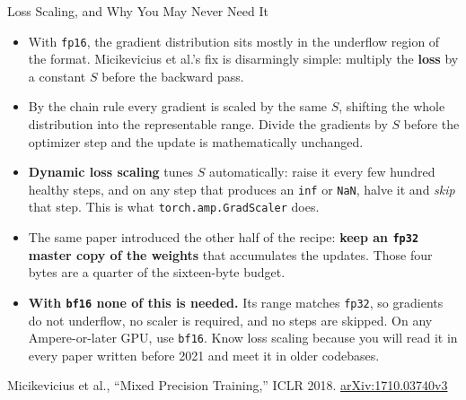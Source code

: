 \begin{frame}[allowframebreaks]{Loss Scaling, and Why You May Never Need It}
  \begin{itemize}\itemsep0.4em
    \item[\textcolor{red}{$\blacktriangleright$}] With \texttt{fp16}, the gradient distribution sits mostly in the underflow region of the format. Micikevicius et al.'s fix is disarmingly simple: multiply the \textbf{loss} by a constant $S$ before the backward pass.
    \item[\textcolor{red}{$\blacktriangleright$}] By the chain rule every gradient is scaled by the same $S$, shifting the whole distribution into the representable range. Divide the gradients by $S$ before the optimizer step and the update is mathematically unchanged.
    \item[\textcolor{red}{$\blacktriangleright$}] \textbf{Dynamic loss scaling} tunes $S$ automatically: raise it every few hundred healthy steps, and on any step that produces an \texttt{inf} or \texttt{NaN}, halve it and \emph{skip} that step. This is what \texttt{torch.amp.GradScaler} does.
    \item[\textcolor{red}{$\blacktriangleright$}] The same paper introduced the other half of the recipe: \textbf{keep an \texttt{fp32} master copy of the weights} that accumulates the updates. Those four bytes are a quarter of the sixteen-byte budget.
    \item[\textcolor{red}{$\blacktriangleright$}] \textbf{With \texttt{bf16} none of this is needed.} Its range matches \texttt{fp32}, so gradients do not underflow, no scaler is required, and no steps are skipped. On any Ampere-or-later GPU, use \texttt{bf16}. Know loss scaling because you will read it in every paper written before 2021 and meet it in older codebases.
  \end{itemize}
  \vspace{0.1em}
  {\scriptsize Micikevicius et al., ``Mixed Precision Training,'' ICLR 2018. \href{https://arxiv.org/abs/1710.03740v3}{arXiv:1710.03740v3}}
\end{frame}

